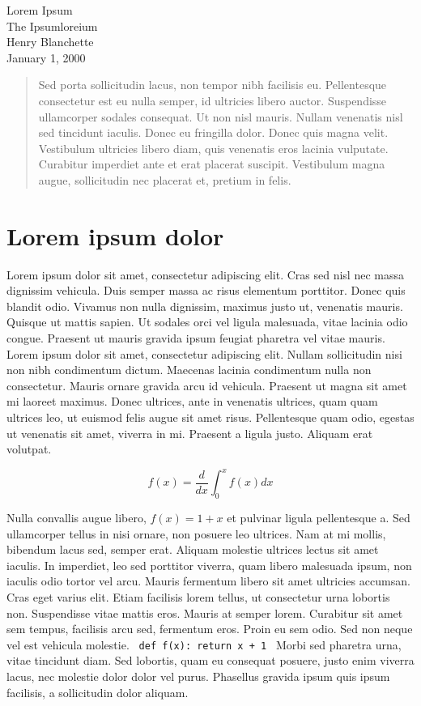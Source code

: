 \documentclass{article}
\begin{document}
\begin{center}
\huge{ Lorem Ipsum }\\[0.4cm]\large{ The Ipsumloreium }\\[0.75cm]\large{ Henry Blanchette }\\[0.5cm]\large{ January 1, 2000 }\\[1.0cm]

\begin{abstract}
 Sed porta sollicitudin lacus, non tempor nibh facilisis eu. Pellentesque consectetur est eu nulla semper, id ultricies libero auctor. Suspendisse ullamcorper sodales consequat. Ut non nisl mauris. Nullam venenatis nisl sed tincidunt iaculis. Donec eu fringilla dolor. Donec quis magna velit. Vestibulum ultricies libero diam, quis venenatis eros lacinia vulputate. Curabitur imperdiet ante et erat placerat suscipit. Vestibulum magna augue, sollicitudin nec placerat et, pretium in felis.


\end{abstract}

\end{center}\section{ Lorem ipsum dolor }

 Lorem ipsum dolor sit amet, consectetur adipiscing elit. Cras sed nisl nec massa dignissim vehicula. Duis semper massa ac risus elementum porttitor. Donec quis blandit odio. Vivamus non nulla dignissim, maximus justo ut, venenatis mauris. Quisque ut mattis sapien. Ut sodales orci vel ligula malesuada, vitae lacinia odio congue. Praesent ut mauris gravida ipsum feugiat pharetra vel vitae mauris. Lorem ipsum dolor sit amet, consectetur adipiscing elit. Nullam sollicitudin nisi non nibh condimentum dictum. Maecenas lacinia condimentum nulla non consectetur. Mauris ornare gravida arcu id vehicula. Praesent ut magna sit amet mi laoreet maximus. Donec ultrices, ante in venenatis ultrices, quam quam ultrices leo, ut euismod felis augue sit amet risus. Pellentesque quam odio, egestas ut venenatis sit amet, viverra in mi. Praesent a ligula justo. Aliquam erat volutpat. 

\[
    f(x) = \frac{d}{dx} \int_0^x f(x) dx
\]

 Nulla convallis augue libero, $ f(x) = 1 + x $ et pulvinar ligula pellentesque a. Sed ullamcorper tellus in nisi ornare, non posuere leo ultrices. Nam at mi mollis, bibendum lacus sed, semper erat. Aliquam molestie ultrices lectus sit amet iaculis. In imperdiet, leo sed porttitor viverra, quam libero malesuada ipsum, non iaculis odio tortor vel arcu. Mauris fermentum libero sit amet ultricies accumsan. Cras eget varius elit. Etiam facilisis lorem tellus, ut consectetur urna lobortis non. Suspendisse vitae mattis eros. Mauris at semper lorem. Curabitur sit amet sem tempus, facilisis arcu sed, fermentum eros. Proin eu sem odio. Sed non neque vel est vehicula molestie. \texttt{ def f(x): return x + 1 } Morbi sed pharetra urna, vitae tincidunt diam. Sed lobortis, quam eu consequat posuere, justo enim viverra lacus, nec molestie dolor dolor vel purus. Phasellus gravida ipsum quis ipsum facilisis, a sollicitudin dolor aliquam. 
\end{document}
